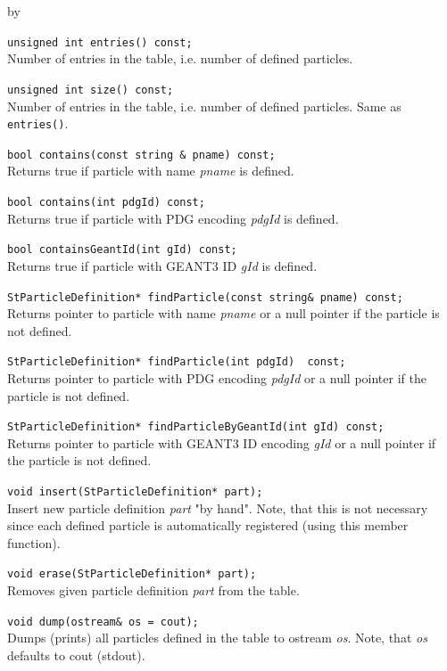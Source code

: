 \documentclass[twoside]{article}
\newcommand{\comp}[1]{\texttt{#1}}%
\newcommand{\args}[1]{\textit{#1}}%
\newcommand{\entrylabel}[1]{\mbox{\textbf{{#1}}}\hfil}%
\newenvironment{entry}
{\begin{list}{}%
    {\renewcommand{\makelabel}{\entrylabel}%
     \setlength{\labelwidth}{90pt}%
     \setlength{\leftmargin}{\labelwidth}
     \advance\leftmargin by \labelsep%
      }%
    }%
  {\end{list}}
\newcommand{\Entrylabel}[1]%
{\raisebox{0pt}[1ex][0pt]{\makebox[\labelwidth][l]%
    {\parbox[t]{\labelwidth}{\hspace{0pt}\textbf{{#1}}}}}}
\newenvironment{Entry}%
{\renewcommand{\entrylabel}{\Entrylabel}\begin{entry}}%
  {\end{entry}}
\begin{document}
\begin{description}
\begin{Entry}
    \verb+unsigned int entries() const;+\\
    Number of entries in the table, i.e. number of
    defined particles.
    
    \verb+unsigned int size() const;+\\ 
    Number of entries in the table, i.e. number of
    defined particles. Same as \comp{entries()}.
    
    \verb+bool contains(const string & pname) const;  +\\
    Returns true if particle with name \args{pname} is defined.
    
    \verb+bool contains(int pdgId) const;   +\\           
    Returns true if particle with PDG encoding \args{pdgId} is defined.
    
    \verb+bool containsGeantId(int gId) const; +\\      
    Returns true if particle with GEANT3 ID \args{gId} is defined.
    
    \verb+StParticleDefinition* findParticle(const string& pname) const;+\\
    Returns pointer to particle with name \args{pname} or a null
    pointer if the particle is not defined.
    
    \verb+StParticleDefinition* findParticle(int pdgId)  const; +\\          
    Returns pointer to particle with PDG encoding \args{pdgId} or a null
    pointer if the particle is not defined.
    
    \verb+StParticleDefinition* findParticleByGeantId(int gId) const;+\\   
    Returns pointer to particle with GEANT3 ID encoding \args{gId} or a null
    pointer if the particle is not defined.
    
    \verb+void insert(StParticleDefinition* part);+\\
    Insert new particle definition \args{part} "by hand".
    Note, that this is not necessary
    since each defined particle is automatically registered
    (using this member function).
    
    \verb+void erase(StParticleDefinition* part);+\\
    Removes given particle definition \args{part} from the table.
    
    \verb+void dump(ostream& os = cout);+\\ 
    Dumps (prints) all particles defined in the table to ostream 
    \args{os}. Note, that \args{os} defaults to cout (stdout).
    

\end{Entry}
\end{description}
\end{document}
